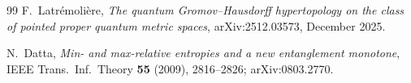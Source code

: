 \documentclass[11pt,a4paper]{article}
\theoremstyle{plain}
\theoremstyle{definition}
\begin{document}
\begin{thebibliography}{99}
F.~Latr\'emoli\`ere,
\newblock \emph{The quantum Gromov--Hausdorff hypertopology on the
class of pointed proper quantum metric spaces},
\newblock arXiv:2512.03573, December 2025.

N.~Datta,
\newblock \emph{Min- and max-relative entropies and a new entanglement
monotone},
\newblock IEEE Trans.~Inf.~Theory \textbf{55} (2009), 2816--2826;
arXiv:0803.2770.

\end{thebibliography}
\end{document}
